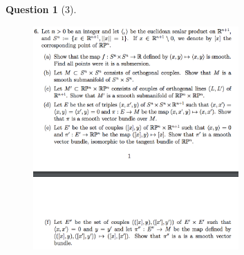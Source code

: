 \documentclass{article} %
\theoremstyle{quest}
\newtheorem*{question}{Question}
\begin{document}
\begin{question}[3]
\hfill
\begin{figure}[h!]
  \centering
    \includegraphics[width=0.7\textwidth]{geo-2-3.png}
\end{figure}
\end{question}
\end{document}
